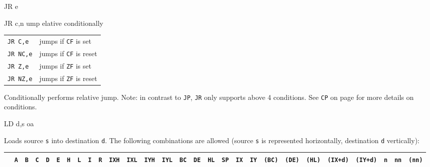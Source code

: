 \documentclass[12pt,twoside,openright,a4paper]{book}
\begin{document}
\begin{basedescript}{
	\desclabelstyle{\multilinelabel}
	\desclabelwidth{3cm}}
\begin{DetailItem}{JR e}
	\end{DetailItem}

	\begin{DetailItem}{JR c,n}
		{ump elative conditionally}
		{}

		\vspace{1ex} %
		\begin{tabular}{@{}ll}
			{\tt JR C,e} & jumps if {\tt CF} is set\\
			{\tt JR NC,e} & jumps if {\tt CF} is reset\\
			{\tt JR Z,e} & jumps if {\tt ZF} is set\\
			{\tt JR NZ,e} & jumps if {\tt ZF} is reset\\
		\end{tabular}
		
		Conditionally performs relative jump. Note: in contrast to {\tt JP}, {\tt JR} only supports above 4 conditions. See {\tt CP} on page \pageref{DetailRefCP} for more details on conditions.

		\begin{DetailEffects}
			\FlagsJRccn
		\end{DetailEffects}
						
		\begin{DetailTiming}
		\end{DetailTiming}

	\end{DetailItem}

	\pagebreak
	\begin{DetailItem}{LD d,s}
		{oa}
		{}

		Loads source {\tt s} into destination {\tt d}. The following combinations are allowed (source {\tt s} is represented horizontally, destination {\tt d} vertically):

		{
			\fontsize{9pt}{9pt}	%
			\setlength{\tabcolsep}{1pt}
			\newcommand{\OO}{$\bullet$}
			\newcommand{\ii}{\cellcolor{llgray}}

			\begin{tabular}{@{}|c|c|c|c|c|c|c|c|c|c|c|c|c|c|c|c|c|c|c|c|c|c|c|c|c|c|c|c|}
				\arrayrulecolor{gray}
				\hline
				& {\tt A} & {\tt B} & {\tt C} & {\tt D} & {\tt E} & {\tt H} & {\tt L} & {\tt I} & {\tt R} & {\tt IXH} & {\tt IXL} & {\tt IYH} & {\tt IYL} & {\tt BC} & {\tt DE} & {\tt HL} & {\tt SP} & {\tt IX} & {\tt IY} & {\tt (BC)} & {\tt (DE)} & {\tt (HL)} & {\tt (IX+d)} & {\tt (IY+d)} & {\tt n} & {\tt nn} & {\tt (nn)} \\
				\hline


\end{tabular}}
\end{DetailItem}
\end{basedescript}
\end{document}
